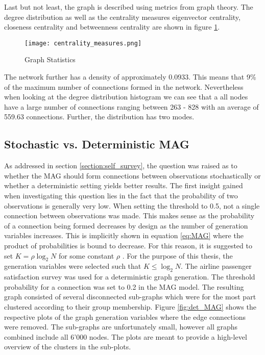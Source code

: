  \noindent Last but not least, the graph is described using metrics from graph
  theory. The degree distribution as well as the centrality measures
  eigenvector centrality, closeness centrality and betweenness centrality are
  shown in figure \ref{fig:centrality_measures}.

  \begin{figure}[h]
	  \centering
	  \texttt{[image: centrality\_measures.png]}
	  \caption{Graph Statistics}
      \label{fig:centrality_measures}
  \end{figure}

  \noindent The network further has a density of approximately 0.0933. This
  means that 9\% of the maximum number of connections formed in the network.
  Nevertheless when looking at the degree distribution histogram we can see 
  that a all nodes have a large number of connections ranging between 263 -
  828 with an average of 559.63 connections. Further, the distribution has two
  modes. 


  \subsection{Stochastic vs. Deterministic MAG}

  As addressed in section \ref{section:self_survey}, the question was raised 
  as to whether the MAG should form connections between observations
  stochastically or whether a deterministic setting yields better results. The 
  first insight gained when investigating this question lies in the fact that 
  the probability of two observations is generally very low. When setting the 
  threshold to 0.5, not a single connection between observations was made. This
  makes sense as the probability of a connection being formed decreases by
  design as the number of generation variables increases. This is implicitly
  shown in equation \ref{eq:MAG} where the product of probabilities is bound to
  decrease. For this reason, it is suggested to set $K=\rho\log_{2}N$
  for some constant $\rho$ \citep[p. 122]{kim2012multiplicative}. For the
  purpose of this thesis, the generation variables were selected such that
  $K\leqslant\log_{2} N$. The airline passenger satisfaction survey was used
  for a deterministic graph generation. The threshold probability for a
  connection was set to 0.2 in the MAG model. The resulting graph consisted of
  several disconnected sub-graphs which were for the most part clustered
  according to their group membership. Figure \ref{fig:det_MAG} shows the
  respective plots of the graph generation variables where the edge connections
  were removed. The sub-graphs are unfortunately small, however all graphs
  combined include all 6'000 nodes. The plots are meant to provide a high-level
  overview of the clusters in the sub-plots. 

